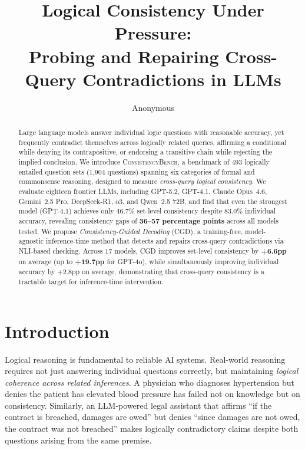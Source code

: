 \documentclass{article}
\title{Logical Consistency Under Pressure: \\Probing and Repairing Cross-Query Contradictions in LLMs}
\author{Anonymous}
\newcommand{\bench}{\textsc{ConsistencyBench}}
\newcommand{\method}{\textsc{CGD}}
\begin{document}
\maketitle

\begin{abstract}
Large language models answer individual logic questions with reasonable accuracy, yet frequently contradict themselves across logically related queries, affirming a conditional while denying its contrapositive, or endorsing a transitive chain while rejecting the implied conclusion. We introduce \bench{}, a benchmark of 493 logically entailed question sets (1,904 questions) spanning six categories of formal and commonsense reasoning, designed to measure \emph{cross-query logical consistency}. We evaluate eighteen frontier LLMs, including GPT-5.2, GPT-4.1, Claude Opus~4.6, Gemini~2.5 Pro, DeepSeek-R1, o3, and Qwen~2.5 72B, and find that even the strongest model (GPT-4.1) achieves only 46.7\% set-level consistency despite 83.0\% individual accuracy, revealing consistency gaps of \textbf{36--57 percentage points} across all models tested. We propose \emph{Consistency-Guided Decoding} (\method{}), a training-free, model-agnostic inference-time method that detects and repairs cross-query contradictions via NLI-based checking. Across 17 models, \method{} improves set-level consistency by \textbf{+6.6pp} on average (up to \textbf{+19.7pp} for GPT-4o), while simultaneously improving individual accuracy by +2.8pp on average, demonstrating that cross-query consistency is a tractable target for inference-time intervention.
\end{abstract}

\section{Introduction}
\label{sec:intro}

Logical reasoning is fundamental to reliable AI systems. Real-world reasoning requires not just answering individual questions correctly, but maintaining \emph{logical coherence across related inferences}. A physician who diagnoses hypertension but denies the patient has elevated blood pressure has failed not on knowledge but on consistency. Similarly, an LLM-powered legal assistant that affirms ``if the contract is breached, damages are owed'' but denies ``since damages are not owed, the contract was not breached'' makes logically contradictory claims despite both questions arising from the same premise.
\end{document}
